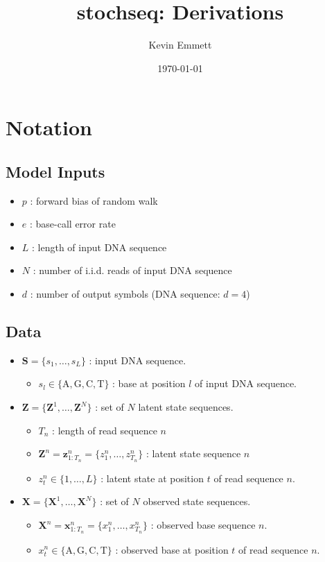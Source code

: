 \documentclass[reqno]{amsart}
\numberwithin{equation}{section}
\begin{document}
\title{stochseq: Derivations}
\author{Kevin Emmett}

\date{\today}
\maketitle

\section{Notation}

\subsection{Model Inputs}
\begin{itemize}
\item $p$ : forward bias of random walk
\item $e$ : base-call error rate
\item $L$ : length of input DNA sequence
\item $N$ : number of i.i.d. reads of input DNA sequence
\item $d$ : number of output symbols (DNA sequence: $d=4$)
\end{itemize}

\subsection{Data}
\begin{itemize}
\item $\mathbf{S} = \{s_1,\ldots,s_L\}$ : input DNA sequence.
\begin{itemize}
\item $s_l \in \{\mathrm{A,G,C,T}\}$ : base at position $l$ of input DNA sequence.
\end{itemize}
\item $\mathbf{Z} =\{\mathbf{Z}^1,\ldots,\mathbf{Z}^N\}$ : set of $N$ latent state sequences.
\begin{itemize}
\item $T_n$ : length of read sequence $n$
\item $\mathbf{Z}^n = \mathbf{z}^n_{1:T_n} = \{z^n_1,\ldots,z^n_{T_n}\}$ : latent state sequence $n$
\item $z_t^n \in \{1,\ldots,L\}$ : latent state at position $t$ of read sequence $n$.
\end{itemize}
\item $\mathbf{X} = \{\mathbf{X}^1,\ldots,\mathbf{X}^N\}$ : set of $N$ observed state sequences.
\begin{itemize}
\item $\mathbf{X}^n = \mathbf{x}_{1:T_n}^n = \{x_1^n,\ldots,x_{T_n}^n\}$ : observed base sequence $n$.
\item $x_t^n \in \{\mathrm{A,G,C,T}\}$ : observed base at position $t$ of read sequence $n$.
\end{itemize}
\end{itemize}
\end{document}
